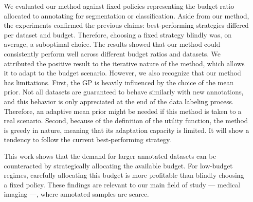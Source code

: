 We evaluated our method against fixed policies representing the budget ratio allocated to annotating for segmentation or classification. Aside from our method, the experiments confirmed the previous claims: best-performing strategies differed per dataset and budget. Therefore, choosing a fixed strategy blindly was, on average, a suboptimal choice. The results showed that our method could consistently perform well across different budget ratios and datasets. We attributed the positive result to the iterative nature of the method, which allows it to adapt to the budget scenario. However, we also recognize that our method has limitations. First, the GP is heavily influenced by the choice of the mean prior. Not all datasets are guaranteed to behave similarly with new annotations, and this behavior is only appreciated at the end of the data labeling process. Therefore, an adaptive mean prior might be needed if this method is taken to a real scenario. Second, because of the definition of the utility function, the method is greedy in nature, meaning that its adaptation capacity is limited. It will show a tendency to follow the current best-performing strategy.

This work shows that the demand for larger annotated datasets can be counteracted by strategically allocating the available budget. For low-budget regimes, carefully allocating this budget is more profitable than blindly choosing a fixed policy. These findings are relevant to our main field of study --- medical imaging ---, where annotated samples are scarce.

